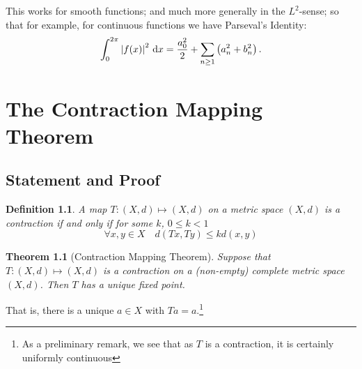\documentclass{notes}
\theoremstyle{plain}
\newtheorem{theorem}[proposition]{Theorem}
\newtheorem{definition}[proposition]{Definition}
\newcommand{\Forall}[1]{\forall #1 \quad}
\begin{document}
This works for smooth functions; and much more 
generally in the $ L^{2} $-sense; so that for example, for 
continuous functions we have Parseval's Identity:
\[
\int_{0}^{2 \pi}\left|f(x)\right|^{2}\,\mathrm{d} x = \frac{a_{0}^{2}}{2} + \sum_{n 
\geq 1}\left( a_{n}^{2}+b_{n}^{2} \right).
\]

\chapter{The Contraction Mapping Theorem}

\section{Statement and Proof}

\begin{definition}
A map $ T\colon (X,d) \mapsto (X,d) $ on a metric space $ (X,d) $ is 
a contraction if and only if for some $ k $, $ 0 \leq k < 1 $
\[ \Forall{x, y \in X} d(Tx,Ty) \leq k d(x,y) \]
\end{definition}

\begin{theorem}[Contraction Mapping Theorem]
Suppose that $ T\colon (X,d) \mapsto (X,d) $ is a contraction on a 
(non-empty) complete metric space $ (X,d) $. Then $ T $ has a unique fixed 
point.
\end{theorem}

That is, there is a unique $ a \in X $ with $ Ta =a $.\footnote{As 
a preliminary remark, we see that as $ T $ is a contraction, it is 
certainly uniformly continuous}
\end{document}
